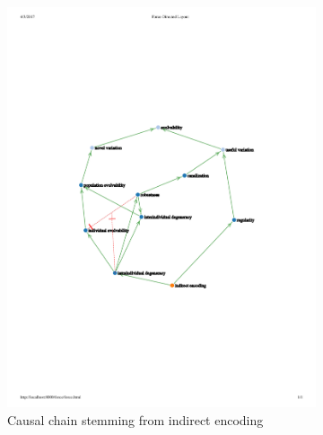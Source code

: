 \begin{figure}
    
            \begin{subfigure}[b]{0.45\textwidth}
        \centering
    	\includegraphics[width=\textwidth]{img/indirect-encoding}
        \caption{Causal chain stemming from indirect encoding}
        \label{subfig:mindmap_indirect-encoding}
    \end{subfigure}%
    \hfill
    \begin{subfigure}[b]{0.45\textwidth}
        \centering

\end{subfigure}
\end{figure}
